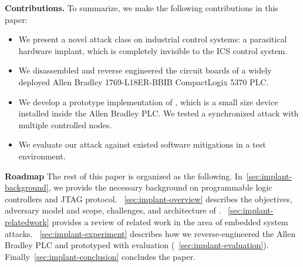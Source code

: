 \textbf{Contributions.} To summarize, we make the following contributions in this paper:
\begin{itemize}[leftmargin=*]
	\item We present a novel attack class on industrial control systems: a parasitical hardware implant, which is completely invisible to the ICS control system.
	\item We disassembled and reverse engineered the circuit boards of a widely deployed Allen Bradley 1769-L18ER-BBIB CompactLogix 5370 PLC. 
	\item We develop a prototype implementation of \name, which is a small size device installed inside the Allen Bradley PLC. We tested a synchronized attack with multiple controlled nodes. 

	\item We evaluate our attack against existed software mitigations in a test environment.

\end{itemize}


\textbf{Roadmap}
The rest of this paper is organized as the following. In~\autoref{sec:implant-background}, we provide the necessary background on programmable logic controllers and JTAG protocol. ~\autoref{sec:implant-overview} describes the objectives, adversary model and scope, challenges, and architecture of \name. ~\autoref{sec:implant-relatedwork} provides a review of related work in the area of embedded system attacks. ~\autoref{sec:implant-experiment} describes how we reverse-engineered the Allen Bradley PLC and prototyped \name with evaluation (~\autoref{sec:implant-evaluation}).  Finally~\autoref{sec:implant-conclusion} concludes the paper.

